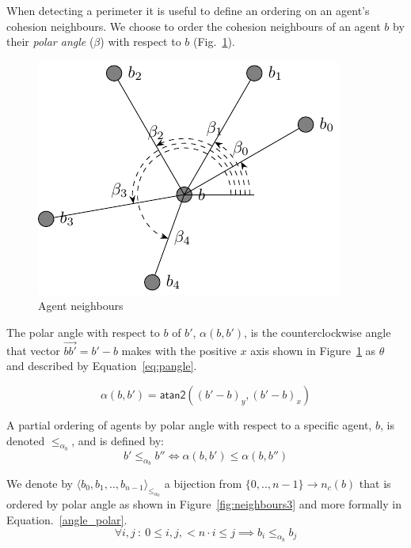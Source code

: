 \documentclass[12pt,a4paper]{IEEEtran}
\newcommand{\vbb}[2]{#2-#1}
\newcommand{\pangle}{\mathit{\alpha}}
\newcommand{\leqaz}[3]{#2 \leq_{\pangle_#1} #3}
\newcommand{\angleordered}[2]{\langle #2 \rangle_{\leqaz{#1}{}{}}}
\begin{document}
When detecting a perimeter it is useful to define an ordering on an agent's cohesion neighbours. We choose to order the cohesion neighbours of an agent $b$ by their \emph{polar
angle} ($\beta$) with respect to $b$ (Fig.~\ref{fig:neighbours2}). 

\begin{figure}[H]
	\centering
	\includegraphics[width=0.8\linewidth]{figures/neighbours2}
	\caption[Agent neighbours]{Agent neighbours}
	\label{fig:neighbours2}
\end{figure}

The polar angle with respect to $b$ of $b'$,
$\pangle(b, b')$, is the counterclockwise angle that vector $\vec{bb'} = b' -
b$ makes with the positive $x$ axis shown in Figure~\ref{fig:neighbours2} as $\theta$ and described by Equation~\ref{eq:pangle}.

\begin{equation}\label{eq:pangle}
	\pangle(b, b') = \mathsf{atan2}((\vbb{b}{b'})_y, (\vbb{b}{b'})_x)
\end{equation} 

A partial ordering of agents by polar angle with respect to a specific agent,
$b$, is denoted $\leqaz{b}{}{}$, and is defined by: 
\begin{equation}\label{angle_ordering}
	\leqaz{b}{b'}{b''} \iff \pangle(b, b') \leq \pangle(b, b'')
\end{equation}

We denote by $\angleordered{b}{b_0, b_1, .., b_{n-1}}$ a bijection from $\{0,.., n-1\} \rightarrow n_c(b)$ that is ordered by polar angle as shown in Figure~\ref{fig:neighbours3} and more formally in Equation.~\ref{angle_polar}.
\begin{equation}\label{angle_polar}
	\forall i,
j~:~0 \leq i, j, < n \cdot i \leq j \implies \leqaz{b}{b_i}{b_j}
\end{equation}
\end{document}
